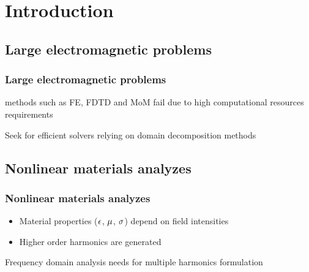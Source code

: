 \documentclass[10pt, mathserif]{beamer}
\begin{document}
\section{Introduction}

\subsection{Large electromagnetic problems}
\frame
{
\frametitle{Large electromagnetic problems}
\begin{block}{}
 methods such as FE, FDTD and MoM fail due to high computational resources requirements
\end{block}
\begin{block}{}
Seek for efficient solvers relying on domain decomposition methods
\end{block}
}

\subsection{Nonlinear materials analyzes}
\frame
{
\frametitle{Nonlinear materials analyzes}
\begin{block}{}
\begin{itemize}
\item Material properties ($\epsilon$, $\mu$, $\sigma$) depend on field intensities
\item Higher order harmonics are generated
\end{itemize}	
\end{block}
\begin{block}{}
Frequency domain analysis needs for multiple harmonics formulation
\end{block}
}


\end{document}
